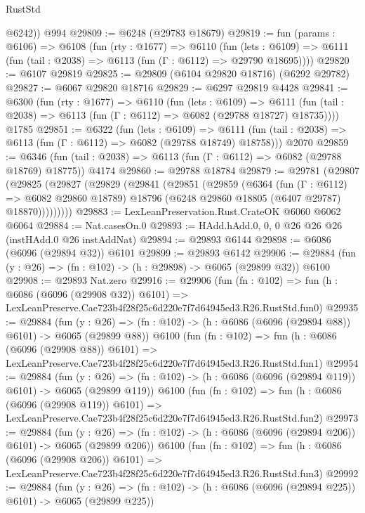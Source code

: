 \begin{lexlean}{RustStd}
\begin{coremodule}
        @6242))
    @994
@29809 := @6248 (@29783 @18679)
@29819 := fun (params : @6106) =>
  @6108
    (fun (rty : @1677) =>
    @6110
      (fun (lets : @6109) =>
      @6111 (fun (tail : @2038) => @6113 (fun (Γ : @6112) => @29790 @18695))))
@29820 := @6107 @29819
@29825 := @29809 (@6104 @29820 @18716) (@6292 @29782)
@29827 := @6067 @29820 @18716
@29829 := @6297 @29819 @4428
@29841 := @6300
    (fun (rty : @1677) =>
    @6110
      (fun (lets : @6109) =>
      @6111 (fun (tail : @2038) => @6113 (fun (Γ : @6112) => @6082 (@29788 @18727) @18735))))
    @1785
@29851 := @6322
    (fun (lets : @6109) =>
    @6111 (fun (tail : @2038) => @6113 (fun (Γ : @6112) => @6082 (@29788 @18749) @18758)))
    @2070
@29859 := @6346
    (fun (tail : @2038) => @6113 (fun (Γ : @6112) => @6082 (@29788 @18769) @18775))
    @4174
@29860 := @29788 @18784
@29879 := @29781
    (@29807
      (@29825
        (@29827
          (@29829
            (@29841
              (@29851
                (@29859
                  (@6364
                    (fun (Γ : @6112) => @6082 @29860 @18789)
                    @18796
                    (@6248 @29860 @18805 (@6407 @29787) @18870)))))))))
@29883 := LexLeanPreservation.Rust.CrateOK @6060 @6062 @6064
@29884 := Nat.casesOn.{0}
@29893 := HAdd.hAdd.{0, 0, 0} @26 @26 @26 (instHAdd.{0} @26 instAddNat)
@29894 := @29893 @6144
@29898 := @6086 (@6096 (@29894 @32)) @6101
@29899 := @29893 @6142
@29906 := @29884 (fun (y : @26) => (fn : @102) -> (h : @29898) -> @6065 (@29899 @32)) @6100
@29908 := @29893 Nat.zero
@29916 := @29906
    (fun (fn : @102) =>
    fun (h : @6086 (@6096 (@29908 @32)) @6101) =>
    LexLeanPreserve.Cae723b4f28f25c6d220e7f7d64945ed3.R26.RustStd.fun0)
@29935 := @29884
    (fun (y : @26) => (fn : @102) -> (h : @6086 (@6096 (@29894 @88)) @6101) -> @6065 (@29899 @88))
    @6100
    (fun (fn : @102) =>
    fun (h : @6086 (@6096 (@29908 @88)) @6101) =>
    LexLeanPreserve.Cae723b4f28f25c6d220e7f7d64945ed3.R26.RustStd.fun1)
@29954 := @29884
    (fun (y : @26) => (fn : @102) -> (h : @6086 (@6096 (@29894 @119)) @6101) -> @6065 (@29899 @119))
    @6100
    (fun (fn : @102) =>
    fun (h : @6086 (@6096 (@29908 @119)) @6101) =>
    LexLeanPreserve.Cae723b4f28f25c6d220e7f7d64945ed3.R26.RustStd.fun2)
@29973 := @29884
    (fun (y : @26) => (fn : @102) -> (h : @6086 (@6096 (@29894 @206)) @6101) -> @6065 (@29899 @206))
    @6100
    (fun (fn : @102) =>
    fun (h : @6086 (@6096 (@29908 @206)) @6101) =>
    LexLeanPreserve.Cae723b4f28f25c6d220e7f7d64945ed3.R26.RustStd.fun3)
@29992 := @29884
    (fun (y : @26) => (fn : @102) -> (h : @6086 (@6096 (@29894 @225)) @6101) -> @6065 (@29899 @225))

\end{coremodule}
\end{lexlean}
